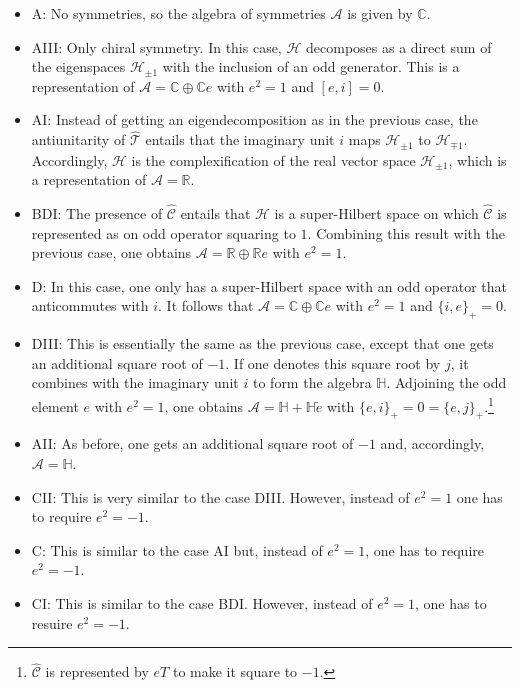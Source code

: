     \begin{itemize}
        \item A: No symmetries, so the algebra of symmetries $\mathcal{A}$ is given by $\mathbb{C}$.
        \item AIII: Only chiral symmetry. In this case, $\mathcal{H}$ decomposes as a direct sum of the eigenspaces $\mathcal{H}_{\pm1}$ with the inclusion of an odd generator. This is a representation of $\mathcal{A}=\mathbb{C}\oplus\mathbb{C}e$ with $e^2=1$ and $[e,i]=0$.
        \item AI: Instead of getting an eigendecomposition as in the previous case, the antiunitarity of $\widehat{\mathcal{T}}$ entails that the imaginary unit $i$ maps $\mathcal{H}_{\pm1}$ to $\mathcal{H}_{\mp1}$. Accordingly, $\mathcal{H}$ is the complexification of the real vector space $\mathcal{H}_{\pm1}$, which is a representation of $\mathcal{A}=\mathbb{R}$.
        \item BDI: The presence of $\widehat{\mathcal{C}}$ entails that $\mathcal{H}$ is a super-Hilbert space on which $\widehat{\mathcal{C}}$ is represented as on odd operator squaring to $1$. Combining this result with the previous case, one obtains $\mathcal{A}=\mathbb{R}\oplus\mathbb{R}e$ with $e^2=1$.
        \item D: In this case, one only has a super-Hilbert space with an odd operator that anticommutes with $i$. It follows that $\mathcal{A}=\mathbb{C}\oplus\mathbb{C}e$ with $e^2=1$ and $\{i,e\}_+=0$.
        \item DIII: This is essentially the same as the previous case, except that one gets an additional square root of $-1$. If one denotes this square root by $j$, it combines with the imaginary unit $i$ to form the algebra $\mathbb{H}$. Adjoining the odd element $e$ with $e^2=1$, one obtains $\mathcal{A}=\mathbb{H}+\mathbb{H}\widetilde{e}$ with $\{e,i\}_+=0=\{e,j\}_+$.\footnote{$\widehat{\mathcal{C}}$ is represented by $eT$ to make it square to $-1$.}
        \item AII: As before, one gets an additional square root of $-1$ and, accordingly, $\mathcal{A}=\mathbb{H}$.
        \item CII: This is very similar to the case DIII. However, instead of $e^2=1$ one has to require $e^2=-1$.
        \item C: This is similar to the case AI but, instead of $e^2=1$, one has to require $e^2=-1$.
        \item CI: This is similar to the case BDI. However, instead of $e^2=1$, one has to resuire $e^2=-1$.
    \end{itemize}

